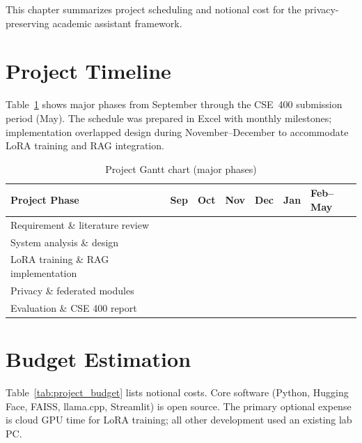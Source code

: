 This chapter summarizes project scheduling and notional cost for the privacy-preserving academic assistant framework.

\section{Project Timeline}
Table~\ref{tab:gantt_chart} shows major phases from September through the CSE~400 submission period (May). The schedule was prepared in Excel with monthly milestones; implementation overlapped design during November--December to accommodate LoRA training and RAG integration.

\begin{table}[H]
\centering
\renewcommand{\arraystretch}{1.3}
\caption{Project Gantt chart (major phases)}
\label{tab:gantt_chart}
\begin{tabular}{|p{}|p{}|p{}|p{}|p{}|p{}|p{}|}
\hline
\textbf{Project Phase} & \textbf{Sep} & \textbf{Oct} & \textbf{Nov} & \textbf{Dec} & \textbf{Jan} & \textbf{Feb--May} \\
\hline
Requirement \& literature review & \cellcolor{gray!40} & \cellcolor{gray!40} &  &  &  &  \\
\hline
System analysis \& design &  & \cellcolor{gray!40} & \cellcolor{gray!40} &  &  &  \\
\hline
LoRA training \& RAG implementation &  &  & \cellcolor{gray!40} & \cellcolor{gray!40} &  &  \\
\hline
Privacy \& federated modules &  &  &  & \cellcolor{gray!40} & \cellcolor{gray!40} &  \\
\hline
Evaluation \& CSE 400 report &  &  &  &  & \cellcolor{gray!40} & \cellcolor{gray!40} \\
\hline
\end{tabular}
\end{table}

\section{Budget Estimation}
Table~\ref{tab:project_budget} lists notional costs. Core software (Python, Hugging Face, FAISS, llama.cpp, Streamlit) is open source. The primary optional expense is cloud GPU time for LoRA training; all other development used an existing lab PC.

